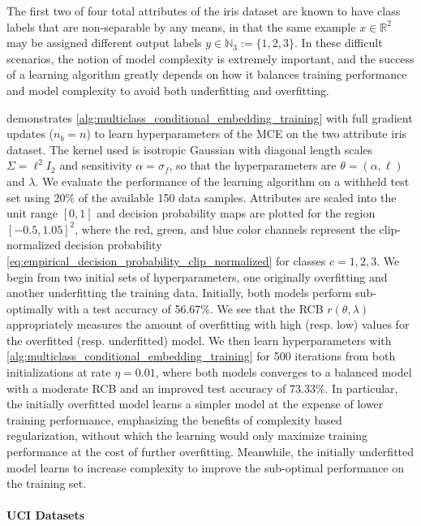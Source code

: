 \documentclass{llncs}
\begin{document}
	The first two of four total attributes of the iris dataset \citep{fisher1936use} are known to have class labels that are non-separable by any means, in that the same example $x \in \mathbb{R}^{2}$ may be assigned different output labels $y \in \mathbb{N}_{3} := \{1, 2, 3\}$. In these difficult scenarios, the notion of model complexity is extremely important, and the success of a learning algorithm greatly depends on how it balances training performance and model complexity to avoid both underfitting and overfitting. 
	
	 demonstrates \cref{alg:multiclass_conditional_embedding_training} with full gradient updates ($n_{b} = n$) to learn hyperparameters of the \gls{MCE} on the two attribute iris dataset. The kernel used is isotropic Gaussian with diagonal length scales $\Sigma = \ell^{2} I_{2}$ and sensitivity $\alpha = \sigma_{f}$, so that the hyperparameters are $\theta = (\alpha, \ell)$ and $\lambda$. We evaluate the performance of the learning algorithm on a withheld test set using 20\% of the available 150 data samples. Attributes are scaled into the unit range $[0, 1]$ and decision probability maps are plotted for the region $[-0.5, 1.05]^{2}$, where the red, green, and blue color channels represent the clip-normalized decision probability \eqref{eq:empirical_decision_probability_clip_normalized} for classes $c = 1, 2, 3$. We begin from two initial sets of hyperparameters, one originally overfitting and another underfitting the training data. Initially, both models perform sub-optimally with a test accuracy of 56.67\%. We see that the \gls{RCB} $r(\theta, \lambda)$ appropriately measures the amount of overfitting with high (resp. low) values for the overfitted (resp. underfitted) model. We then learn hyperparameters with \cref{alg:multiclass_conditional_embedding_training} for 500 iterations from both initializations at rate $\eta = 0.01$, where both models converges to a balanced model with a moderate \gls{RCB} and an improved test accuracy of 73.33\%. In particular, the initially overfitted model learns a simpler model at the expense of lower training performance, emphasizing the benefits of complexity based regularization, without which the learning would only maximize training performance at the cost of further overfitting. Meanwhile, the initially underfitted model learns to increase complexity to improve the sub-optimal performance on the training set.
	
	\paragraph{UCI Datasets}
	
\end{document}
